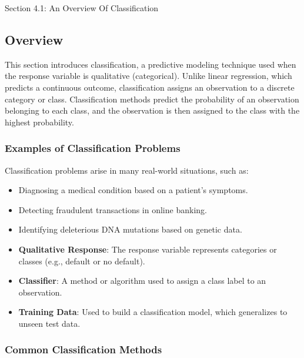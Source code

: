 \begin{notes}{Section 4.1: An Overview Of Classification}
    \subsection*{Overview}

    This section introduces classification, a predictive modeling technique used when the response variable is qualitative (categorical). Unlike linear regression, which predicts a continuous outcome, 
    classification assigns an observation to a discrete category or class. Classification methods predict the probability of an observation belonging to each class, and the observation is then assigned 
    to the class with the highest probability.
    
    \subsubsection*{Examples of Classification Problems}
    
    Classification problems arise in many real-world situations, such as:
    \begin{itemize}
        \item Diagnosing a medical condition based on a patient’s symptoms.
        \item Detecting fraudulent transactions in online banking.
        \item Identifying deleterious DNA mutations based on genetic data.
    \end{itemize}
    
    \begin{highlight}
        \begin{itemize}
            \item \textbf{Qualitative Response}: The response variable represents categories or classes (e.g., default or no default).
            \item \textbf{Classifier}: A method or algorithm used to assign a class label to an observation.
            \item \textbf{Training Data}: Used to build a classification model, which generalizes to unseen test data.
        \end{itemize}
    \end{highlight}
    
    \subsubsection*{Common Classification Methods}
    

\end{notes}
